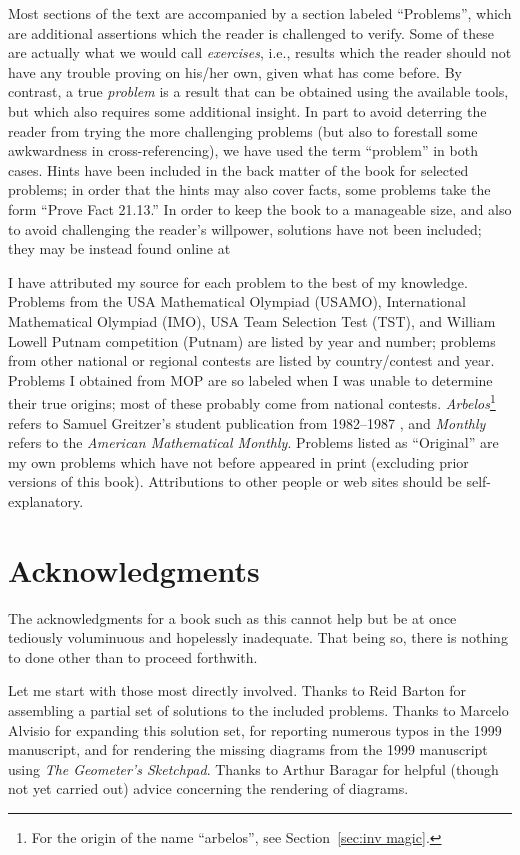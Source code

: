 \documentclass[12pt]{book}
\newcounter{exc}
\numberwithin{exc}{section}
\numberwithin{figure}{section}
\numberwithin{equation}{theorem}
\begin{document}
Most sections of the text are accompanied by a section labeled
``Problems'', which are additional assertions which the reader
is challenged to verify. Some of these are actually what we would call
\emph{exercises},  i.e., results which the reader 
should not have
any trouble proving on his/her own, given what has come before.
By contrast, a true \emph{problem}  is a result that 
can be obtained using
the available tools, but which also requires some additional insight.
In part to avoid deterring the reader from trying the more challenging 
problems (but also to forestall some 
awkwardness in cross-referencing), we have used 
the term ``problem'' in both cases.
Hints have been included in the back matter
of the book for selected problems; in order that the hints
may also cover facts,
some problems take the form ``Prove Fact 21.13.''
In order to keep the book to a manageable size, and also to avoid challenging
the reader's willpower, solutions have not been included; they may be
instead found online at 

I have attributed my source for each problem to the best of my 
knowledge. Problems from the USA Mathematical Olympiad (USAMO),
International Mathematical Olympiad (IMO), USA Team Selection Test
(TST), and William Lowell Putnam
competition (Putnam) are listed by year and
number; problems from other national or regional contests
are listed by country/contest
and year. 
Problems I obtained from MOP are so labeled when I was unable to determine
their true origins; most of these probably come from national contests.
\emph{Arbelos}\footnote{For the origin of the name ``arbelos'', see
Section~\ref{sec:inv magic}.}
refers to Samuel Greitzer's student publication from 1982--1987
\cite{bib:greitzer},
and \emph{Monthly} refers to the \textit{American Mathematical Monthly}.
Problems listed as ``Original'' are my own problems which
have not before appeared in print (excluding prior versions of this
book). Attributions to other people or web sites should be self-explanatory.

\section{Acknowledgments}

The acknowledgments for a book such as this cannot help but be at once
tediously voluminuous and hopelessly inadequate. 
That being so, there is nothing to done other than to proceed forthwith.

Let me start with those most directly involved. Thanks to Reid 
Barton  for assembling a partial set of solutions to
the included problems. Thanks to Marcelo Alvisio 
for expanding this solution set, for reporting numerous typos in the
1999 manuscript, and for rendering the missing diagrams from the 1999
manuscript using \textit{The Geometer's 
Sketchpad\textsuperscript{\textregistered}}.
Thanks to Arthur Baragar 
for helpful (though not yet carried out)
advice concerning the rendering of diagrams.
\end{document}
